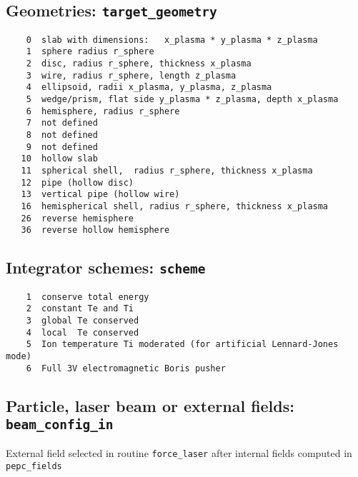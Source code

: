 \documentclass[11pt,psfig]{article}
\begin{document}
\subsection{Geometries:  {\tt target\_geometry}}
\begin{verbatim}
    0  slab with dimensions:   x_plasma * y_plasma * z_plasma
    1  sphere radius r_sphere
    2  disc, radius r_sphere, thickness x_plasma
    3  wire, radius r_sphere, length z_plasma
    4  ellipsoid, radii x_plasma, y_plasma, z_plasma
    5  wedge/prism, flat side y_plasma * z_plasma, depth x_plasma
    6  hemisphere, radius r_sphere
    7  not defined
    8  not defined
    9  not defined 
   10  hollow slab
   11  spherical shell,  radius r_sphere, thickness x_plasma
   12  pipe (hollow disc)
   13  vertical pipe (hollow wire)
   16  hemispherical shell, radius r_sphere, thickness x_plasma
   26  reverse hemisphere
   36  reverse hollow hemisphere
\end{verbatim}

\subsection{Integrator schemes:  {\tt scheme}}
\begin{verbatim}
    1  conserve total energy
    2  constant Te and Ti 
    3  global Te conserved
    4  local  Te conserved
    5  Ion temperature Ti moderated (for artificial Lennard-Jones mode) 
    6  Full 3V electromagnetic Boris pusher  
\end{verbatim}

\subsection{Particle, laser beam or external fields:   {\tt beam\_config\_in}}
  External field selected in routine {\tt force\_laser}
  after internal fields computed in {\tt pepc\_fields}
\end{document}
